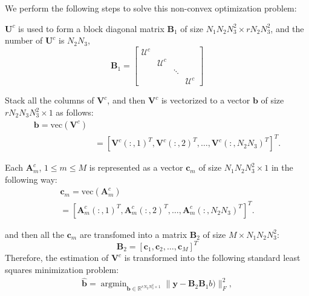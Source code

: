 \documentclass[journal,article,submit,moreauthors,pdftex,10pt,a4paper]{Definitions/mdpi}
\theoremstyle{plain}
\theoremstyle{definition}
\theoremstyle{remark}
\begin{document}
We perform the following steps to solve this non-convex optimization problem:
\begin{steps}
\item $\mathbf{U}^c$ is used to form a block diagonal matrix $\mathbf{B}_1$ of size $N_1N_2N^2_3 \times rN_2N^2_3$, and the number of $\mathbf{U}^c$ is $N_2N_3$,
    \[
        \mathbf{B}_1 = 
        \begin{bmatrix}
            \mathcal{U}^c & & & \\
            & \mathcal{U}^c & & \\
            & & \ddots & \\
            & & & \mathcal{U}^c
        \end{bmatrix}
    \]
\item Stack all the columns of $\mathbf{V}^c$, and then $\mathbf{V}^c$ is vectorized to a vector $\mathbf{b}$ of size $rN_2N_3N^2_3 \times 1$ as follows:
    \begin{eqnarray}
        \mathbf{b} = \text{vec}(\mathbf{V}^c) \nonumber\\ & =[\mathbf{V}^c(:,1)^T, \mathbf{V}^c(:,2)^T, \dots, \mathbf{V}^c(:,N_2N_3)^T]^T. \end{eqnarray}

\item Each $\mathbf{A}^c_m$, $1 \leq m \leq M$ is represented as a vector $\mathbf{c}_m$ of size $N_1N_2N^2_3 \times 1$ in the following way:
    \begin{eqnarray*}
        \mathbf{c}_m = \text{vec}(\mathbf{A}^c_m) \\
        =[\mathbf{A}^c_m(:,1)^T, \mathbf{A}^c_m(:,2)^T, \dots, \mathbf{A}^c_m(:,N_2N_3)^T]^T.
    \end{eqnarray*}

    and then all the $\mathbf{c}_m$ are transfomed into a matrix $\mathbf{B}_2$ of size $M \times N_1N_2N^2_3$:
    \[
        \mathbf{B}_2 = [\mathbf{c}_1, \mathbf{c}_2, \dots, \mathbf{c}_M]^T
    \]
    Therefore, the estimation of $\mathbf{V}^c$ is transformed into the following standard least squares minimization problem:
        \begin{eqnarray*}
            \widehat{\mathbf{b}} =
            \mathop\mathop{\arg\min}_{ \mathbf{b} \in \mathbb{R}^{rN_2N^2_3 \times 1}} \| \mathbf{y} - \mathbf{B}_2\mathbf{B}_1b) \|_F^2 , \\
        \end{eqnarray*}

\end{steps}
\end{document}
